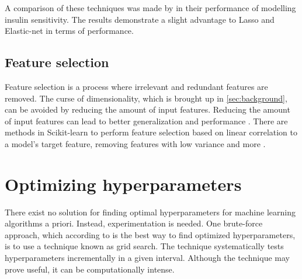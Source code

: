 	A comparison of these techniques was made by \cite{ARTICLE:21} in their performance of modelling insulin sensitivity. The results demonstrate a slight advantage to Lasso and Elastic-net in terms of performance. 

	\subsection{Feature selection} \label{sec:feature_selection}
		Feature selection is a process where irrelevant and redundant features are removed. The curse of dimensionality, which is brought up in \ref{sec:background}, can be avoided by reducing the amount of input features. Reducing the amount of input features can lead to better generalization and performance \cite{ARTICLE:10, ARTICLE:22}. There are methods in Scikit-learn to perform feature selection based on linear correlation to a model's target feature, removing features with low variance and more \cite{WEBSITE:30}.
	

	
\section{Optimizing hyperparameters} \label{sec:hyperparameters}
	There exist no solution for finding optimal hyperparameters for machine learning algorithms a priori. Instead, experimentation is needed. One brute-force approach, which according to \cite{BOOK:9} is the best way to find optimized hyperparameters, is to use a technique known as grid search. The technique systematically tests hyperparameters incrementally in a given interval. Although the technique may prove useful, it can be computationally intense.

